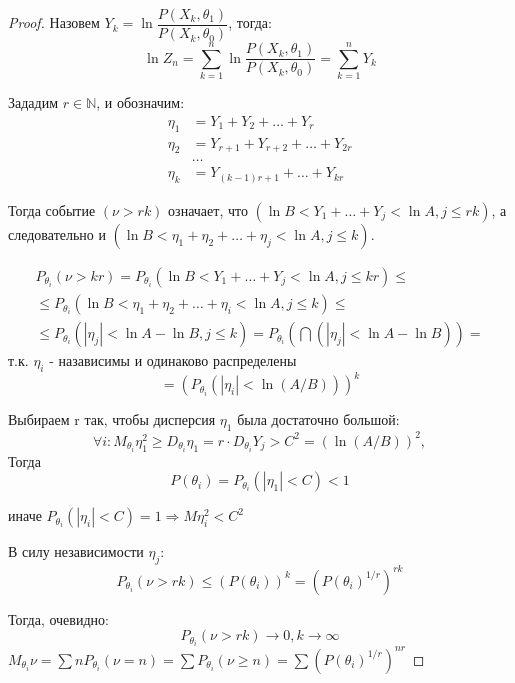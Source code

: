 \begin{proof}
  Назовем $Y_k = \ln \dfrac{P(X_k, \theta_1)}{P(X_k, \theta_0)}$, тогда:
  \[
    \ln Z_n = \sum_{k=1}^n \ln \dfrac{P(X_k, \theta_1)}{P(X_k, \theta_0)} = \sum_{k=1}^n Y_k
  \]

  Зададим $r \in \mathbb{N}$, и обозначим:
  \begin{align*}
    \eta_1 &= Y_1 + Y_2 + \dots + Y_r \\
    \eta_2 &= Y_{r+1} + Y_{r+2} + \dots + Y_{2r} \\
           &\dots \\
    \eta_k &= Y_{(k-1) r + 1} + \dots + Y_{kr}
  \end{align*}

  Тогда событие $(\nu > rk)$ означает, что $(\ln B < Y_1 + \dots + Y_j < \ln A, j \leqslant rk)$, а следовательно и $(\ln B < \eta_1 + \eta_2 + \dots + \eta_j < \ln A, j \leqslant k)$.

  \begin{multline*}
    P_{\theta_i} (\nu > kr)
    = P_{\theta_i} (\ln B < Y_1 + \dots + Y_j < \ln A, j \leqslant kr) \leqslant \\
    \leqslant P_{\theta_i} (\ln B < \eta_1 + \eta_2 + \dots + \eta_i < \ln A, j \leqslant k) \leqslant \\
    \leqslant P_{\theta_i} (|\eta_j| < \ln A - \ln B, j \leqslant k)
    = P_{\theta_i} \left(\bigcap (|\eta_j| < \ln A - \ln B)\right) =
  \end{multline*}
  т.к. $\eta_i$ - назависимы и одинаково распределены \\
  \[
    = (P_{\theta_i} (|\eta_i| < \ln (A/B)))^k
  \]

  Выбираем r так, чтобы дисперсия $\eta_1$ была достаточно большой:
  \[
    \forall i : M_{\theta_i} \eta_1^2 \geqslant D_{\theta_i} \eta_1
    = r \cdot D_{\theta_i} Y_j > C^2 = (\ln (A/B))^2,
  \]
  Тогда
  \[
    P(\theta_i) = P_{\theta_i} (|\eta_1| < C) < 1
  \]

  иначе $P_{\theta_i} (|\eta_i| < C) = 1 \Rightarrow M \eta_i^2 < C^2$

  В силу независимости $\eta_j$:
  \[
    P_{\theta_i} (\nu > rk) \leqslant (P(\theta_i))^k = (P(\theta_i)^{1/r})^{rk}
  \]

  Тогда, очевидно:
  \[
    P_{\theta_i} (\nu > rk) \to 0, k \to \infty
  \]
  $M_{\theta_i} \nu = \sum n P_{\theta_i} (\nu  = n) = \sum P_{\theta_i} (\nu \geqslant n) = \sum ( P(\theta_i)^{1/r} )^{nr}$
\end{proof}

